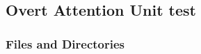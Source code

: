 \documentclass{CSSRforAfrica}
\begin{document}
%  
%  







 \subsection{Overt Attention Unit test} 
\label{subsection:overt_attention_test}

\subsubsection{Files and Directories}
\label{subsubsection:overt_attention_test_files}
 
\end{document}
